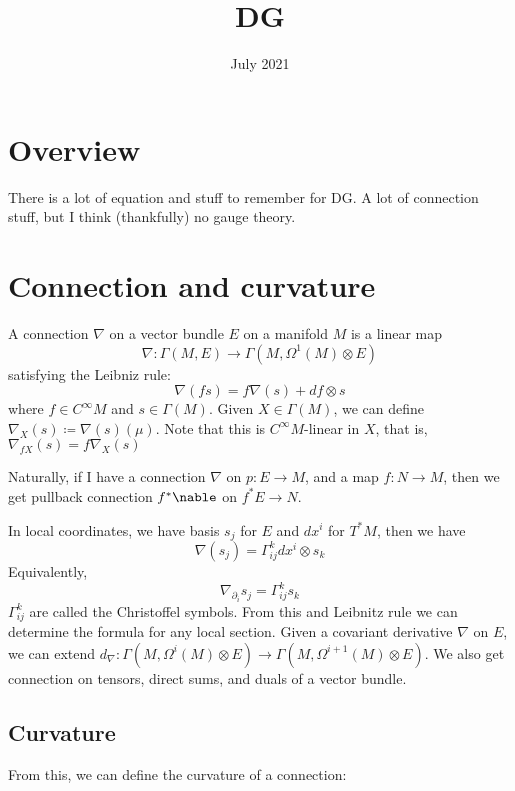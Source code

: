 \documentclass[main.tex]{subfiles}
\title{DG}
\date{July 2021}
\begin{document}
\maketitle


\section{Overview}
There is a lot of equation and stuff to remember for DG. A lot of connection stuff, but I think (thankfully) no gauge theory.

\section{Connection and curvature}


\begin{definition}
A connection $\nabla$ on a vector bundle $E$ on a manifold $M$ is a linear map 
$$
\nabla: \Gamma(M, E) \rightarrow \Gamma(M, \Omega^1(M) \otimes E )
$$
satisfying the Leibniz rule:
$$
\nabla(f s) = f \nabla(s) + df \otimes s
$$
where $f \in C^{\infty}M$ and $s \in \Gamma(M)$. Given $X \in \Gamma(M)$, we can define 
$\nabla_X(s) \coloneqq \nabla(s) (\mu)$. Note that this is $C^{\infty}M$-linear in $X$, that is, $\nabla_{fX}(s) = f \nabla_{X}(s)$
\end{definition}

Naturally, if I have a connection $\nabla$ on $p: E \rightarrow M$, and a map $f : N \rightarrow M$, then we get pullback connection $f^*\nable$ on $f^*E \rightarrow N$.

In local coordinates, we have basis $s_j$ for $E$ and $dx^i$ for $T^*M$, then we have 
$$
\nabla(s_j) = \Gamma_{ij}^k dx^i \otimes s_k
$$
Equivalently, 
$$
\nabla_{\partial_i} s_j = \Gamma_{ij}^k s_k
$$
$\Gamma_{ij}^k$ are called the Christoffel symbols. From this and Leibnitz rule we can determine the formula for any local section.
Given a covariant derivative $\nabla$ on $E$, we can extend $d_\nabla: \Gamma(M, \Omega^i(M) \otimes E) \rightarrow \Gamma(M, \Omega^{i+1}(M) \otimes E)$. We also get connection on tensors, direct sums, and duals of a vector bundle.

\subsection{Curvature}

From this, we can define the curvature of a connection:
\end{document}
